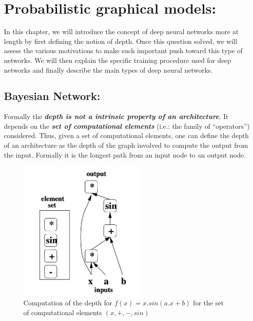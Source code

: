 \documentclass[a4paper,11pt]{report}
\newcommand{\Important}[1]{\textbf{{\em #1}}}
\begin{document}
\chapter{Probabilistic graphical models:}
	\label{chap:Deep neural networks}
	In this chapter, we will introduce the concept of deep neural networks more at length by first defining the notion of depth. Once this question solved, we will assess the various motivations to make such important push toward this type of networks. We will then explain the specific training procedure used for deep networks and finally describe the main types of deep neural networks.

	
	\section{Bayesian Network:}  
		\label{seq:Deep neural networks/Depth definition}
		Formally the \Important{depth is not a intrinsic property of an architecture}. It depends on the \Important{set of computational elements} (i.e.: the family of ``operators'') considered. Thus, given a set of computational elements, one can define the depth of an architecture as the depth of the graph involved to compute the output from the input. Formally it is the longest path from an input node to an output node.
               
		\begin{figure}[H]
			\begin{center}
				\includegraphics[width=2.5in]{Images/DNN/depth_example.png}
				\caption[The computation of depth]{Computation of the depth for $f(x)= x.sin(a.x +b)$ for the set of computational elements $(x, +, -, sin)$}
				\label{fig:Computation of the depth}
			\end{center}
		\end{figure}
        
\end{document}
